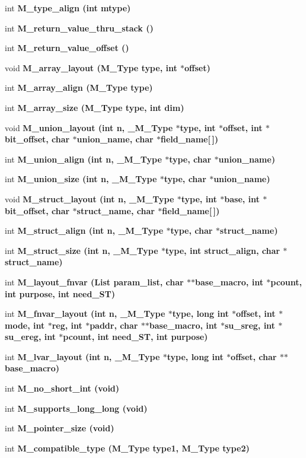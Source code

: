 \begin{CompactItemize}
\item 
int \bf{M\_\-type\_\-align} (int mtype)
\item 
int \bf{M\_\-return\_\-value\_\-thru\_\-stack} ()
\item 
int \bf{M\_\-return\_\-value\_\-offset} ()
\item 
void \bf{M\_\-array\_\-layout} (\bf{M\_\-Type} type, int $\ast$offset)
\item 
int \bf{M\_\-array\_\-align} (\bf{M\_\-Type} type)
\item 
int \bf{M\_\-array\_\-size} (\bf{M\_\-Type} type, int dim)
\item 
void \bf{M\_\-union\_\-layout} (int n, \bf{\_\-M\_\-Type} $\ast$type, int $\ast$offset, int $\ast$bit\_\-offset, char $\ast$union\_\-name, char $\ast$field\_\-name[$\,$])
\item 
int \bf{M\_\-union\_\-align} (int n, \bf{\_\-M\_\-Type} $\ast$type, char $\ast$union\_\-name)
\item 
int \bf{M\_\-union\_\-size} (int n, \bf{\_\-M\_\-Type} $\ast$type, char $\ast$union\_\-name)
\item 
void \bf{M\_\-struct\_\-layout} (int n, \bf{\_\-M\_\-Type} $\ast$type, int $\ast$base, int $\ast$bit\_\-offset, char $\ast$struct\_\-name, char $\ast$field\_\-name[$\,$])
\item 
int \bf{M\_\-struct\_\-align} (int n, \bf{\_\-M\_\-Type} $\ast$type, char $\ast$struct\_\-name)
\item 
int \bf{M\_\-struct\_\-size} (int n, \bf{\_\-M\_\-Type} $\ast$type, int struct\_\-align, char $\ast$struct\_\-name)
\item 
int \bf{M\_\-layout\_\-fnvar} (\bf{List} param\_\-list, char $\ast$$\ast$base\_\-macro, int $\ast$pcount, int purpose, int need\_\-ST)
\item 
int \bf{M\_\-fnvar\_\-layout} (int n, \bf{\_\-M\_\-Type} $\ast$type, long int $\ast$offset, int $\ast$\bf{mode}, int $\ast$reg, int $\ast$paddr, char $\ast$$\ast$base\_\-macro, int $\ast$su\_\-sreg, int $\ast$su\_\-ereg, int $\ast$pcount, int need\_\-ST, int purpose)
\item 
int \bf{M\_\-lvar\_\-layout} (int n, \bf{\_\-M\_\-Type} $\ast$type, long int $\ast$offset, char $\ast$$\ast$base\_\-macro)
\item 
int \bf{M\_\-no\_\-short\_\-int} (void)
\item 
int \bf{M\_\-supports\_\-long\_\-long} (void)
\item 
int \bf{M\_\-pointer\_\-size} (void)
\item 
int \bf{M\_\-compatible\_\-type} (\bf{M\_\-Type} type1, \bf{M\_\-Type} type2)
$$
\end{CompactItemize}
